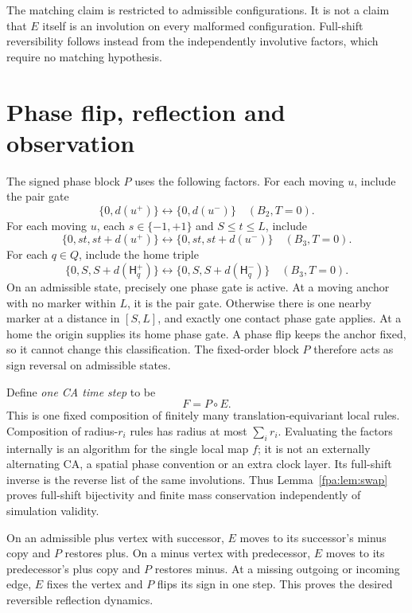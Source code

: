 \documentclass[11pt,a4paper]{article}
\numberwithin{equation}{section}
\newcommand{\Hh}{\mathsf H}\newcommand{\Oo}{\mathsf O}\newcommand{\Ii}{\mathsf I}\newcommand{\HH}{\mathsf H}
\begin{document}
The matching claim is restricted to admissible configurations. It is not a
claim that $E$ itself is an involution on every malformed configuration.
Full-shift reversibility follows instead from the independently involutive
factors, which require no matching hypothesis.

\section{Phase flip, reflection and observation}\label{fpa:sec:reflection}
The signed phase block $P$ uses the following factors. For each moving $u$,
include the pair gate
\[
 \{0,d(u^+)\}\longleftrightarrow\{0,d(u^-)\}
 \quad(B_2,T=0).                                    \tag{13}
\]
For each moving $u$, each $s\in\{-1,+1\}$ and $S\le t\le L$, include
\[
 \{0,st,st+d(u^+)\}\longleftrightarrow
 \{0,st,st+d(u^-)\}\quad(B_3,T=0).                   \tag{14}
\]
For each $q\in Q$, include the home triple
\[
 \{0,S,S+d(\Hh_q^+)\}\longleftrightarrow
 \{0,S,S+d(\Hh_q^-)\}\quad(B_3,T=0).                 \tag{15}
\]
On an admissible state, precisely one phase gate is active. At a moving anchor
with no marker within $L$, it is the pair gate. Otherwise there is one nearby
marker at a distance in $[S,L]$, and exactly one contact phase gate applies.
At a home the origin supplies its home phase gate. A phase flip keeps the
anchor fixed, so it cannot change this classification. The fixed-order block
$P$ therefore acts as sign reversal on admissible states.

Define \emph{one CA time step} to be
\[
                         F=P\circ E.                \tag{16}\label{fpa:eq:F}
\]
This is one fixed composition of finitely many translation-equivariant local
rules. Composition of radius-$r_i$ rules has radius at most $\sum_i r_i$.
Evaluating the factors internally is an algorithm for the single local map
$f$; it is not an externally alternating CA, a spatial phase convention or an
extra clock layer. Its full-shift inverse is the reverse list of the same
involutions. Thus Lemma~\ref{fpa:lem:swap} proves full-shift bijectivity and finite
mass conservation independently of simulation validity.

On an admissible plus vertex with successor, $E$ moves to its successor's
minus copy and $P$ restores plus. On a minus vertex with predecessor, $E$
moves to its predecessor's plus copy and $P$ restores minus. At a missing
outgoing or incoming edge, $E$ fixes the vertex and $P$ flips its sign in one
step. This proves the desired reversible reflection dynamics.
\end{document}
